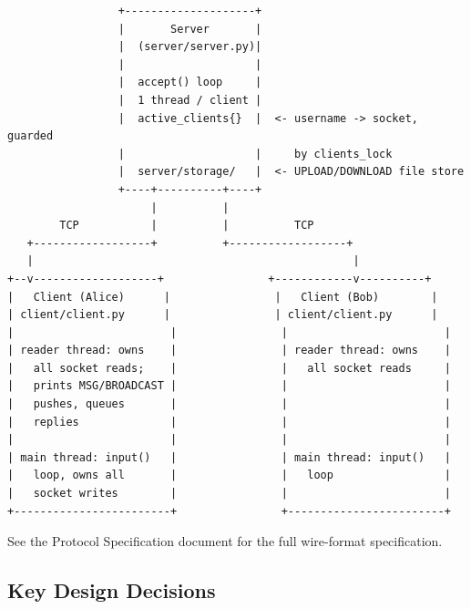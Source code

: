 \documentclass[11pt]{article}
\begin{document}
\begin{verbatim}
                 +--------------------+
                 |       Server       |
                 |  (server/server.py)|
                 |                    |
                 |  accept() loop     |
                 |  1 thread / client |
                 |  active_clients{}  |  <- username -> socket, guarded
                 |                    |     by clients_lock
                 |  server/storage/   |  <- UPLOAD/DOWNLOAD file store
                 +----+----------+----+
                      |          |
        TCP           |          |          TCP
   +------------------+          +------------------+
   |                                                 |
+--v-------------------+                +------------v----------+
|   Client (Alice)      |                |   Client (Bob)        |
| client/client.py      |                | client/client.py      |
|                        |                |                        |
| reader thread: owns    |                | reader thread: owns    |
|   all socket reads;    |                |   all socket reads     |
|   prints MSG/BROADCAST |                |                        |
|   pushes, queues       |                |                        |
|   replies              |                |                        |
|                        |                |                        |
| main thread: input()   |                | main thread: input()   |
|   loop, owns all       |                |   loop                 |
|   socket writes        |                |                        |
+------------------------+                +------------------------+
\end{verbatim}

See the Protocol Specification document for the full wire-format
specification.

\subsection{Key Design Decisions}
\end{document}
